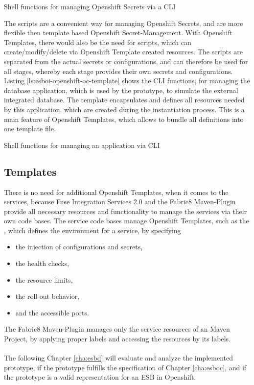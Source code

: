 \begin{listing}[h]
	\caption{Shell functions for managing Openshift Secrets via a CLI}
	\label{ls:esboi-openshift-oc-service}
\end{listing}

The scripts are a convenient way for managing Openshift Secrets, and are more flexible then template based Openshift Secret-Management. With Openshift Templates, there would also be the need for scripts, which can create/modify/delete via Openshift Template created resources. The scripts are separated from the actual secrets or configurations, and can therefore be used for all stages, whereby each stage provides their own secrets and configurations. \\

Listing \vref{ls:esboi-openshift-oc-template} shows the CLI functions, for managing the database application, which is used by the prototype, to simulate the external integrated database. The template encapsulates and defines all resources needed by this application, which are created during the instantiation process. This is a main feature of Openshift Templates, which allows to bundle all definitions into one template file.
 
\begin{listing}[h]
	\caption{Shell functions for managing an application via CLI}
	\label{ls:esboi-openshift-oc-template}
\end{listing}

\subsection{Templates}
\label{sec:esbi-openshift-config}
There is no need for additional Openshift Templates, when it comes to the services, because Fuse Integration Services 2.0 and the Fabric8 Maven-Plugin provide all necessary resources and functionality to manage the services via their own code bases. The service code bases manage Openshift Templates, such as the , which defines the environment for a service, by specifying
\begin{itemize}
	\item the injection of configurations and secrets,
	\item the health checks,
	\item the resource limits,
	\item the roll-out behavior,
	\item and the accessible ports.
\end{itemize}

The Fabric8 Maven-Plugin manages only the service resources of an Maven Project, by applying proper labels and accessing the resources by its labels.
\\ \\
The following Chapter \vref{cha:esbd} will evaluate and analyze the implemented prototype, if the prototype fulfills the specification of Chapter \vref{cha:esboc}, and if the prototype is a valid representation for an ESB in Openshift.


